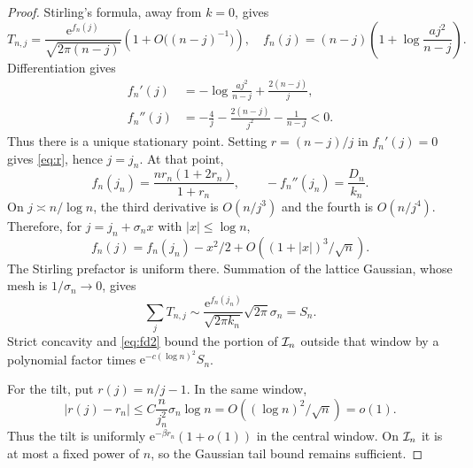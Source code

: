\documentclass[11pt,a4paper]{article}
\numberwithin{equation}{section}
\theoremstyle{definition}
\theoremstyle{remark}\newtheorem{remark}[theorem]{Remark}
\newcommand{\ee}{\mathrm e}\newcommand{\dd}{\mathrm d}
\begin{document}
\begin{proof}
Stirling's formula, away from $k=0$, gives
\begin{equation}
 T_{n,j}=\frac{\ee^{f_n(j)}}{\sqrt{2\pi(n-j)}}
 \left(1+O\bigl((n-j)^{-1}\bigr)\right),\quad
 f_n(j)=(n-j)\left(1+\log\frac{aj^2}{n-j}\right).
 \label{eq:f}
\end{equation}
Differentiation gives
\begin{align}
 f_n'(j)&=-\log\frac{aj^2}{n-j}+\frac{2(n-j)}j,\label{eq:fd1}\\
 f_n''(j)&=-\frac4j-\frac{2(n-j)}{j^2}-\frac1{n-j}<0.\label{eq:fd2}
\end{align}
Thus there is a unique stationary point. Setting $r=(n-j)/j$ in
$f_n'(j)=0$ gives \eqref{eq:r}, hence $j=j_n$. At that point,
\begin{equation}
 f_n(j_n)=\frac{nr_n(1+2r_n)}{1+r_n},\qquad
 -f_n''(j_n)=\frac{D_n}{k_n}.
 \label{eq:fstationary}
\end{equation}
On $j\asymp n/\log n$, the third derivative is
$O(n/j^3)$ and the fourth is $O(n/j^4)$. Therefore, for
$j=j_n+\sigma_n x$ with $|x|\le\log n$,
\[
 f_n(j)=f_n(j_n)-x^2/2+O((1+|x|)^3/\sqrt n).
\]
The Stirling prefactor is uniform there. Summation of the lattice Gaussian,
whose mesh is $1/\sigma_n\to0$, gives
\[
 \sum_jT_{n,j}\sim
 \frac{\ee^{f_n(j_n)}}{\sqrt{2\pi k_n}}\sqrt{2\pi}\sigma_n=S_n.
\]
Strict concavity and \eqref{eq:fd2} bound the portion of $\mathcal I_n$ outside that
window by a polynomial factor times $\ee^{-c(\log n)^2}S_n$.

For the tilt, put $r(j)=n/j-1$. In the same window,
\[
 |r(j)-r_n|\le C\frac{n}{j_n^2}\sigma_n\log n
 =O((\log n)^2/\sqrt n)=o(1).
\]
Thus the tilt is uniformly $\ee^{-\beta r_n}(1+o(1))$ in the central window.
On $\mathcal I_n$ it is at most a fixed power of $n$, so the Gaussian tail bound
remains sufficient.


\end{proof}
\end{document}
